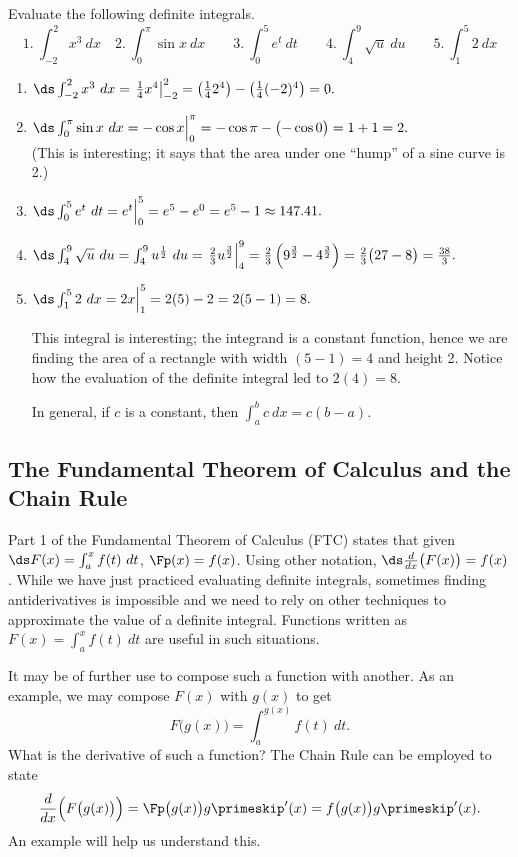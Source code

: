 \begin{example}\label{ex_ftc4}
Evaluate the following definite integrals.
\[
1.\ \int_{-2}^2 x^3\ dx \quad 2.\ \int_0^\pi \sin x\ dx \qquad
3.\ \int_0^5 e^t\ dt \qquad 4.\ \int_4^9 \sqrt{u}\ du\qquad 5.\ \int_1^5 2\ dx
\]
\vspace{-10pt}
\solution
\begin{enumerate}
\item	$\ds \int_{-2}^2 x^3\ dx = \left.\frac14x^4\right|_{-2}^2 = \left(\frac142^4\right) - \left(\frac14(-2)^4\right) = 0.$
\item	$\ds \int_0^\pi \sin x\ dx = -\cos x\Big|_0^\pi = -\cos \pi- \bigl(-\cos 0\bigr) = 1+1=2.$ \\
(This is interesting; it says that the area under one ``hump'' of a sine curve is 2.)
\item	$\ds \int_0^5e^t\ dt = e^t\Big|_0^5 = e^5 - e^0 = e^5-1 \approx 147.41.$
\item	$\ds \int_4^9 \sqrt{u}\ du = \int_4^9 u^\frac12\ du = \left.\frac23u^\frac32\right|_4^9 = \frac23\left(9^\frac32-4^\frac32\right) = \frac23\bigl(27-8\bigr) =\frac{38}3.$
\item	$\ds \int_1^5 2\ dx = 2x\Big|_1^5 = 2(5)-2=2(5-1)=8.$ 

This integral is interesting; the integrand is a constant function, hence we are finding the area of a rectangle with width $(5-1)=4$ and height 2. Notice how the evaluation of the definite integral led to $2(4)=8$. 

In general, if $c$ is a constant, then $\int_a^b c\ dx = c(b-a)$.
\end{enumerate}
\end{example}

\subsection{The Fundamental Theorem of Calculus and the Chain Rule}

Part 1 of the Fundamental Theorem of Calculus (FTC) states that given $\ds F(x) = \int_a^x f(t)\ dt$,  $\Fp(x) = f(x)$. Using other notation, $\ds \frac{d}{dx}\bigl(F(x)\bigr) = f(x)$. While we have just practiced evaluating definite integrals, sometimes finding antiderivatives is impossible and we need to rely on other techniques to approximate the value of a definite integral. Functions written as $F(x) = \int_a^x f(t)\ dt$ are useful in such situations.

It may be of further use to compose such a function with another. As an example, we may compose $F(x)$ with $g(x)$ to get
\[F\bigl(g(x)\bigr) = \int_a^{g(x)} f(t)\ dt.\]
What is the derivative of such a function? The Chain Rule can be employed to state
\[
\frac{d}{dx}\Bigl(F\bigl(g(x)\bigr)\Bigr) = \Fp\bigl(g(x)\bigr)g\primeskip'(x)
= f\bigl(g(x)\bigr)g\primeskip'(x).
\]
An example will help us understand this.

